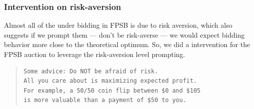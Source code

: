 \documentclass{article} %
\begin{document}









\subsubsection{Intervention on risk-aversion}
Almost all of the under bidding in FPSB is due to risk aversion,
which also suggests if we prompt them — don’t be risk-averse — we would expect bidding behavior more close to the theoretical optimum.
So, we did a intervention for the FPSB auction to leverage the risk-aversion level prompting.

\begin{quote}
\begin{lstlisting}[basicstyle=\ttfamily]
Some advice: Do NOT be afraid of risk. 
All you care about is maximizing expected profit. 
For example, a 50/50 coin flip between $0 and $105 
is more valuable than a payment of $50 to you.
\end{lstlisting}
\end{quote}
\end{document}

